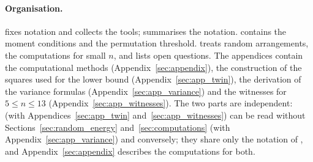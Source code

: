 \paragraph{Organisation.}
 fixes notation and collects the tools;  summarises the notation.
 contains the moment conditions and the permutation threshold.
 treats random arrangements,  the computations for small $n$, and  lists open questions.
The appendices contain the computational methods (Appendix~\ref{sec:appendix}), the construction of the squares used for the lower bound (Appendix~\ref{sec:app_twin}), the derivation of the variance formulas (Appendix~\ref{sec:app_variance}) and the witnesses for $5\le n\le13$ (Appendix~\ref{sec:app_witnesses}).
The two parts are independent:  (with Appendices~\ref{sec:app_twin} and~\ref{sec:app_witnesses}) can be read without Sections~\ref{sec:random_energy} and~\ref{sec:computations} (with Appendix~\ref{sec:app_variance}) and conversely; they share only the notation of , and Appendix~\ref{sec:appendix} describes the computations for both.

